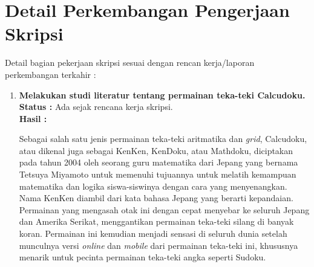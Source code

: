 \documentclass[a4paper,twoside]{article}
\begin{document}
\section{Detail Perkembangan Pengerjaan Skripsi}
Detail bagian pekerjaan skripsi sesuai dengan rencan kerja/laporan perkembangan terkahir :
	\begin{enumerate}
		\item \textbf{Melakukan studi literatur tentang permainan teka-teki Calcudoku.}\\
		{\bf Status :} Ada sejak rencana kerja skripsi.\\
		{\bf Hasil :}
		
		Sebagai salah satu jenis permainan teka-teki aritmatika dan \textit{grid}, Calcudoku, atau dikenal juga sebagai KenKen, KenDoku, atau Mathdoku, diciptakan pada tahun 2004 oleh seorang guru matematika dari Jepang yang bernama Tetsuya Miyamoto untuk memenuhi tujuannya untuk melatih kemampuan matematika dan logika siswa-siswinya dengan cara yang menyenangkan. Nama KenKen diambil dari kata bahasa Jepang yang berarti kepandaian. Permainan yang mengasah otak ini dengan cepat menyebar ke seluruh Jepang dan Amerika Serikat, menggantikan permainan teka-teki silang di banyak koran. Permainan ini kemudian menjadi sensasi di seluruh dunia setelah munculnya versi \textit{online} dan \textit{mobile} dari permainan teka-teki ini, khususnya menarik untuk pecinta permainan teka-teki angka seperti Sudoku.


\end{enumerate}
\end{document}
